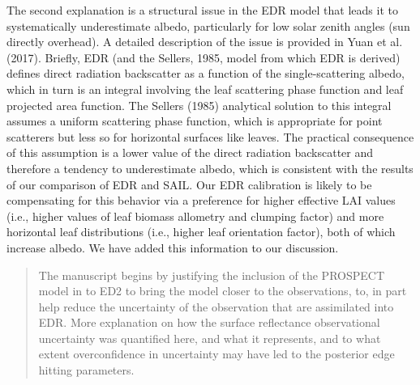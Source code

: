 The second explanation is a structural issue in the EDR model that leads it to systematically underestimate albedo, particularly for low solar zenith angles (sun directly overhead). A detailed description of the issue is provided in Yuan et al. (2017). Briefly, EDR (and the Sellers, 1985, model from which EDR is derived) defines direct radiation backscatter as a function of the single-scattering albedo, which in turn is an integral involving the leaf scattering phase function and leaf projected area function. The Sellers (1985) analytical solution to this integral assumes a uniform scattering phase function, which is appropriate for point scatterers but less so for horizontal surfaces like leaves. The practical consequence of this assumption is a lower value of the direct radiation backscatter and therefore a tendency to underestimate albedo, which is consistent with the results of our comparison of EDR and SAIL. Our EDR calibration is likely to be compensating for this behavior via a preference for higher effective LAI values (i.e., higher values of leaf biomass allometry and clumping factor) and more horizontal leaf distributions (i.e., higher leaf orientation factor), both of which increase albedo. We have added this information to our discussion.



\begin{quote}
  The manuscript begins by justifying the inclusion of the PROSPECT model in to ED2 to bring the model closer to the observations, to, in part help reduce the uncertainty of the observation that are assimilated into EDR. More explanation on how the surface reflectance observational uncertainty was quantified here, and what it represents, and to what extent overconfidence in uncertainty may have led to the posterior edge hitting parameters.
\end{quote}

